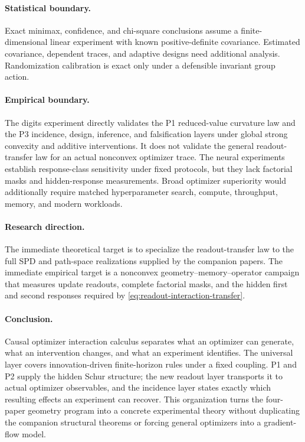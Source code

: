 \paragraph{Statistical boundary.}
Exact minimax, confidence, and chi-square conclusions assume a finite-dimensional linear experiment with known positive-definite covariance.  Estimated covariance, dependent traces, and adaptive designs need additional analysis.  Randomization calibration is exact only under a defensible invariant group action.

\paragraph{Empirical boundary.}
The digits experiment directly validates the P1 reduced-value curvature law and the P3 incidence, design, inference, and falsification layers under global strong convexity and additive interventions.  It does not validate the general readout-transfer law for an actual nonconvex optimizer trace.  The neural experiments establish response-class sensitivity under fixed protocols, but they lack factorial masks and hidden-response measurements.  Broad optimizer superiority would additionally require matched hyperparameter search, compute, throughput, memory, and modern workloads.

\paragraph{Research direction.}
The immediate theoretical target is to specialize the readout-transfer law to the full SPD and path-space realizations supplied by the companion papers.  The immediate empirical target is a nonconvex geometry--memory--operator campaign that measures update readouts, complete factorial masks, and the hidden first and second responses required by \cref{eq:readout-interaction-transfer}.

\paragraph{Conclusion.}
Causal optimizer interaction calculus separates what an optimizer can generate, what an intervention changes, and what an experiment identifies.  The universal layer covers innovation-driven finite-horizon rules under a fixed coupling.  P1 and P2 supply the hidden Schur structure; the new readout layer transports it to actual optimizer observables, and the incidence layer states exactly which resulting effects an experiment can recover.  This organization turns the four-paper geometry program into a concrete experimental theory without duplicating the companion structural theorems or forcing general optimizers into a gradient-flow model.

